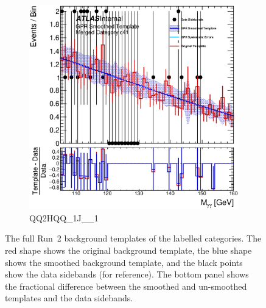 \begin{figure}
\begin{center}
\begin{subfigure}[T]{0.49\linewidth}
	\includegraphics[width=\linewidth]{figures/background/gpr/coupCatTemplates/GPR_Smoothed_Plot_hmgg_c41.eps}
	\caption{QQ2HQQ\_1J\_\_1}
\end{subfigure}
\caption{The full Run~2 background templates of the labelled categories. The red shape shows the original background template, the blue shape shows the smoothed background template, and the black points show the data sidebands (for reference). The bottom panel shows the fractional difference between the smoothed and un-smoothed templates and the data sidebands. }
 \label{fig:gpr_coupcat_10}
 \end{center}
\end{figure}

